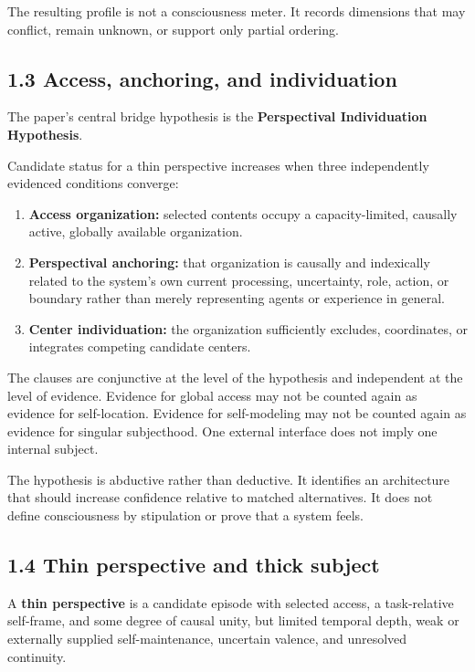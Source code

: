 \documentclass[
  11pt,
]{article}
\providecommand{\tightlist}{%
  \setlength{\itemsep}{0pt}\setlength{\parskip}{0pt}}
\begin{document}
The resulting profile is not a consciousness meter. It records
dimensions that may conflict, remain unknown, or support only partial
ordering.

\subsection{1.3 Access, anchoring, and
individuation}\label{access-anchoring-and-individuation}

The paper's central bridge hypothesis is the \textbf{Perspectival
Individuation Hypothesis}.

Candidate status for a thin perspective increases when three
independently evidenced conditions converge:

\begin{enumerate}
\def\labelenumi{\arabic{enumi}.}
\tightlist
\item
  \textbf{Access organization:} selected contents occupy a
  capacity-limited, causally active, globally available organization.
\item
  \textbf{Perspectival anchoring:} that organization is causally and
  indexically related to the system's own current processing,
  uncertainty, role, action, or boundary rather than merely representing
  agents or experience in general.
\item
  \textbf{Center individuation:} the organization sufficiently excludes,
  coordinates, or integrates competing candidate centers.
\end{enumerate}

The clauses are conjunctive at the level of the hypothesis and
independent at the level of evidence. Evidence for global access may not
be counted again as evidence for self-location. Evidence for
self-modeling may not be counted again as evidence for singular
subjecthood. One external interface does not imply one internal subject.

The hypothesis is abductive rather than deductive. It identifies an
architecture that should increase confidence relative to matched
alternatives. It does not define consciousness by stipulation or prove
that a system feels.

\subsection{1.4 Thin perspective and thick
subject}\label{thin-perspective-and-thick-subject}

A \textbf{thin perspective} is a candidate episode with selected access,
a task-relative self-frame, and some degree of causal unity, but limited
temporal depth, weak or externally supplied self-maintenance, uncertain
valence, and unresolved continuity.
\end{document}
